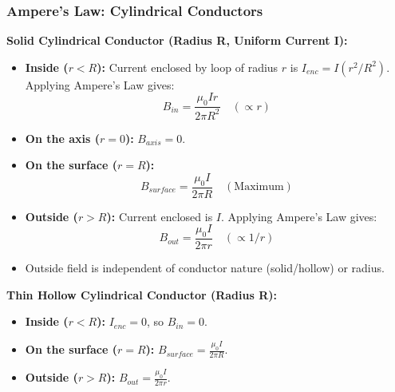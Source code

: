 \begin{frame}[t]
    \frametitle{\textcolor{deepnavy}{\textbf{Ampere's Law: Cylindrical Conductors}}}
    \renewcommand{\familydefault}{\rmdefault}
    \small

      \item<+-> \textbf{Solid Cylindrical Conductor (Radius R, Uniform Current I):}
        \begin{itemize}[<+->]
              \item \textbf{Inside ($r < R$):} Current enclosed by loop of radius $r$ is $I_{enc} = I (r^2/R^2)$.   Applying Ampere's Law gives:
                  \begin{equation*} B_{in} = \frac{\mu_0 I r}{2\pi R^2} \quad (\propto r) \end{equation*}
              \item \textbf{On the axis ($r = 0$):} $B_{axis} = 0$.
              \item \textbf{On the surface ($r = R$):}
                  \begin{equation*} B_{surface} = \frac{\mu_0 I}{2\pi R} \quad (\text{Maximum}) \end{equation*}
              \item \textbf{Outside ($r > R$):} Current enclosed is $I$.   Applying Ampere's Law gives:
                  \begin{equation*} B_{out} = \frac{\mu_0 I}{2\pi r} \quad (\propto 1/r) \end{equation*}
              \item Outside field is independent of conductor nature (solid/hollow) or radius.
        \end{itemize} %

    \vspace{0.5em}

      \item<+-> \textbf{Thin Hollow Cylindrical Conductor (Radius R):}
        \begin{itemize}[<+->]
              \item \textbf{Inside ($r < R$):} $I_{enc} = 0$, so $B_{in} = 0$.
              \item \textbf{On the surface ($r = R$):} $B_{surface} = \frac{\mu_0 I}{2\pi R}$.
              \item \textbf{Outside ($r > R$):} $B_{out} = \frac{\mu_0 I}{2\pi r}$.
        \end{itemize} %
\end{frame}


